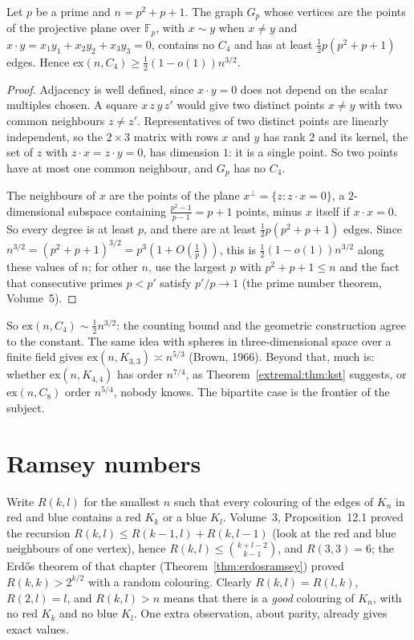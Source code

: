 \begin{theorem}\label{extremal:thm:polarity}
Let $p$ be a prime and $n=p^2+p+1$. The graph $G_p$ whose vertices are the points of the projective plane over $\mathbb F_p$, with $x\sim y$ when $x\ne y$ and
$x\cdot y=x_1y_1+x_2y_2+x_3y_3=0$, contains no $C_4$ and has at least $\frac12p(p^2+p+1)$ edges. Hence $\mathrm{ex}(n,C_4)\ge\frac12(1-o(1))n^{3/2}$.
\end{theorem}
\begin{proof}
Adjacency is well defined, since $x\cdot y=0$ does not depend on the scalar multiples chosen. A square $x\,z\,y\,z'$ would give two distinct points
$x\neq y$ with two common neighbours $z\ne z'$. Representatives of two distinct points are linearly independent, so the $2\times3$ matrix with rows $x$
and $y$ has rank $2$ and its kernel, the set of $z$ with $z\cdot x=z\cdot y=0$, has dimension $1$: it is a single point. So two points have at most one common
neighbour, and $G_p$ has no $C_4$.

The neighbours of $x$ are the points of the plane $x^\perp=\{z:z\cdot x=0\}$, a $2$-dimensional subspace containing $\frac{p^2-1}{p-1}=p+1$ points, minus $x$
itself if $x\cdot x=0$. So every degree is at least $p$, and there are at least $\frac12p(p^2+p+1)$ edges. Since $n^{3/2}=(p^2+p+1)^{3/2}=p^3(1+O(\frac1p))$, this is
$\frac12(1-o(1))n^{3/2}$ along these values of $n$; for other $n$, use the largest $p$ with $p^2+p+1\le n$ and the fact that consecutive primes $p<p'$ satisfy
$p'/p\to1$ (the prime number theorem, Volume~5).
\end{proof}

So $\mathrm{ex}(n,C_4)\sim\frac12n^{3/2}$: the counting bound and the geometric construction agree to the constant. The same idea with spheres in
three-dimensional space over a finite field gives $\mathrm{ex}(n,K_{3,3})\asymp n^{5/3}$ (Brown, 1966). Beyond that, much is: whether $\mathrm{ex}(n,K_{4,4})$ has order $n^{7/4}$, as Theorem~\ref{extremal:thm:kst} suggests, or $\mathrm{ex}(n,C_8)$ order $n^{5/4}$, nobody knows. The bipartite
case is the frontier of the subject.

\section{Ramsey numbers}

Write $R(k,l)$ for the smallest $n$ such that every colouring of the edges of $K_n$ in red and blue contains a red $K_k$ or a blue $K_l$. Volume~3, Proposition~12.1
proved the recursion $R(k,l)\le R(k-1,l)+R(k,l-1)$ (look at the red and blue neighbours of one vertex), hence $R(k,l)\le\binom{k+l-2}{k-1}$, and $R(3,3)=6$; the Erd\H os theorem of that chapter
(Theorem~\ref{thm:erdosramsey}) proved $R(k,k)>2^{k/2}$ with a random colouring. Clearly $R(k,l)=R(l,k)$, $R(2,l)=l$, and $R(k,l)>n$ means that there is a \emph{good} colouring of $K_n$, with no red
$K_k$ and no blue $K_l$. One extra observation, about parity, already gives exact values.

